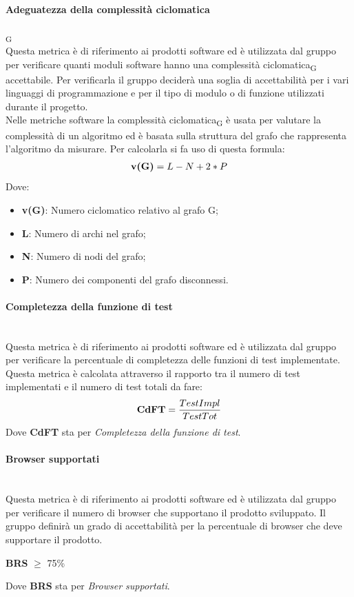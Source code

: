 \paragraph{Adeguatezza della complessità ciclomatica}\textsubscript{G}\mbox{}\\
Questa metrica è di riferimento ai prodotti software ed è utilizzata dal gruppo per verificare quanti moduli software hanno una complessità ciclomatica\textsubscript{G} accettabile. Per verificarla il gruppo deciderà una soglia di accettabilità per i vari linguaggi di programmazione e per il tipo di modulo o di funzione utilizzati durante il progetto.\\
Nelle metriche software la complessità ciclomatica\textsubscript{G} è usata per valutare la complessità di un algoritmo ed è basata sulla struttura del grafo che rappresenta l’algoritmo da misurare. Per calcolarla si fa uso di questa formula:
\begin{align*}
	\centering
	\textbf{v(G)} = L - N + 2 * P
\end{align*}
Dove:
\begin{itemize}
	\item \textbf{v(G)}: Numero ciclomatico relativo al grafo G;
	\item \textbf{L}: Numero di archi nel grafo;
	\item \textbf{N}: Numero di nodi del grafo;
	\item \textbf{P}: Numero dei componenti del grafo disconnessi.
\end{itemize}
\paragraph{Completezza della funzione di test}\mbox{}\\
Questa metrica è di riferimento ai prodotti software ed è utilizzata dal gruppo per verificare la percentuale di completezza delle funzioni di test implementate. Questa metrica è calcolata attraverso il rapporto tra il numero di test implementati e il numero di test totali da fare:
\begin{align*}
	\centering
	\textbf{CdFT} = \frac{TestImpl}{TestTot}
\end{align*}
Dove \textbf{CdFT} sta per \textit{Completezza della funzione di test}.
\paragraph{Browser supportati}\mbox{}\\
Questa metrica è di riferimento ai prodotti software ed è utilizzata dal gruppo per verificare il numero di browser che supportano il prodotto sviluppato. Il gruppo definirà un grado di accettabilità per la percentuale di browser che deve supportare il prodotto.
\begin{center}
	\textbf{BRS} $\geq$ 75\%
\end{center}
Dove \textbf{BRS} sta per \textit{Browser supportati}.

